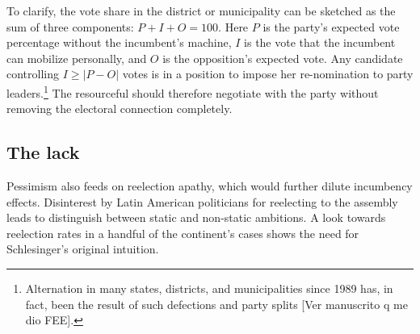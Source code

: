 \documentclass[letter,12pt]{article}
\begin{document}
To clarify, the vote share in the district or municipality can be sketched as the sum of three components: $P + I + O = 100$. Here $P$ is the party's expected vote percentage without the incumbent's machine, $I$ is the vote that the incumbent can mobilize personally, and $O$ is the opposition's expected vote. Any candidate controlling $I \ge |P-O|$ votes is in a position to impose her re-nomination to party leaders.\footnote{Alternation in many states, districts, and municipalities since 1989 has, in fact, been the result of such defections and party splits [Ver manuscrito q me dio FEE].} The resourceful should therefore negotiate with the party without removing the electoral connection completely.

\subsection{The lack}

Pessimism also feeds on reelection apathy, which would further dilute incumbency effects. Disinterest by Latin American politicians for reelecting to the assembly leads \citet{morgenstern.2002b} to distinguish between static and non-static ambitions. A look towards reelection rates in a handful of the continent's cases shows the need for Schlesinger's \citeyearpar{schlesinger.1966} original intuition.
\end{document}
